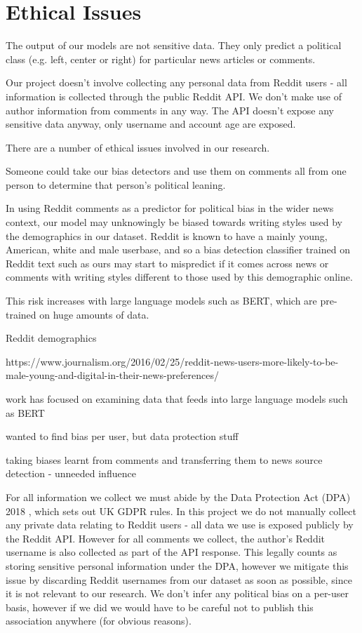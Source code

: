 \section{Ethical Issues}

The output of our models are not sensitive data. They only predict a political class (e.g. left, center or right) for particular news articles or comments. 

Our project doesn't involve collecting any personal data from Reddit users - all information is collected through the public Reddit API. We don't make use of author information from comments in any way. The API doesn't expose any sensitive data anyway, only username and account age are exposed.



There are a number of ethical issues involved in our research.

Someone could take our bias detectors and use them on comments all from one person to determine that person's political leaning.

In using Reddit comments as a predictor for political bias in the wider news context, our model may unknowingly be biased towards writing styles used by the demographics in our dataset. Reddit is known to have a mainly young, American, white and male userbase, and so a bias detection classifier trained on Reddit text such as ours may start to mispredict if it comes across news or comments with writing styles different to those used by this demographic online. 

This risk increases with large language models such as BERT, which are pre-trained on huge amounts of data. 

Reddit demographics


https://www.journalism.org/2016/02/25/reddit-news-users-more-likely-to-be-male-young-and-digital-in-their-news-preferences/

work has focused on examining data that feeds into large language models such as BERT


wanted to find bias per user, but data protection stuff

taking biases learnt from comments and transferring them to news source detection - unneeded influence


For all information we collect we must abide by the Data Protection Act (DPA) 2018 \cite{dpa}, which sets out UK GDPR rules. In this project we do not manually collect any private data relating to Reddit users - all data we use is exposed publicly by the Reddit API. However for all comments we collect, the author's Reddit username is also collected as part of the API response. This legally counts as storing sensitive personal information under the DPA, however we mitigate this issue by discarding Reddit usernames from our dataset as soon as possible, since it is not relevant to our research. We don't infer any political bias on a per-user basis, however if we did we would have to be careful not to publish this association anywhere (for obvious reasons).

